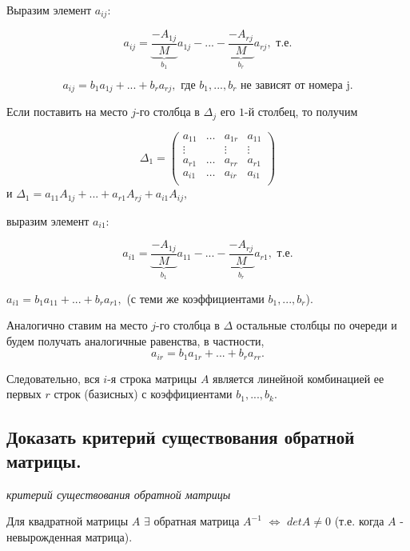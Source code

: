 \begin{enumerate}
Выразим элемент $a_{ij}:$

$$a_{ij} = \underbrace{\frac{-A_{1j}}{M}}_{b_1}a_{1j} - ... - \underbrace{\frac{-A_{rj}}{M}}_{b_r}a_{rj}, \text{ т.е.}$$ 

$$a_{ij} = b_1a_{1j} + ... + b_ra_{rj}, \text{ где } b_1, ..., b_r \text{ не зависят от номера j.}$$ 

Если поставить на место $j$-го столбца в $\Delta_j$ его $1$-й столбец, то получим

$$
\Delta_1 = 
\begin{pmatrix}
    a_{11}&\ldots&a_{1r}&a_{11}\\
    \vdots&&\vdots&\vdots\\
    a_{r1}&\ldots&a_{rr}&a_{r1}\\
    a_{i1}&\ldots&a_{ir}&a_{i1}\\
\end{pmatrix}
$$
и $\Delta_1 = a_{11}A_{1j} + ... + a_{r1}A_{rj} + a_{i1}A_{ij},$

выразим элемент $a_{i1}:$

$$a_{i1} = \underbrace{\frac{-A_{1j}}{M}}_{b_1}a_{11} - ... - \underbrace{\frac{-A_{rj}}{M}}_{b_r}a_{r1},\text{ т.е.}$$ 

$a_{i1} = b_1a_{11} + ... + b_ra_{r1}, $ (с теми же коэффициентами $b_1, ..., b_r$).

Аналогично ставим на место $j$-го столбца в $\Delta$ остальные столбцы по очереди и будем получать аналогичные равенства, в частности,
$$a_{ir} = b_1a_{1r} + ... + b_ra_{rr}.$$

Следовательно, вся $i$-я строка матрицы $A$ является линейной комбинацией ее первых $r$ строк (базисных) с коэффициентами $b_1, ..., b_k$.

\end{enumerate}

\ep

\subsection{Доказать критерий существования обратной матрицы.}

\textit{критерий существования обратной матрицы}

\vspace*{15pt}

Для квадратной матрицы $A$ $\exists$ обратная матрица $A^{-1}$ $\iff$ $detA \ne 0$ (т.е. когда $A$ - невырожденная матрица).

\vspace*{15pt}

